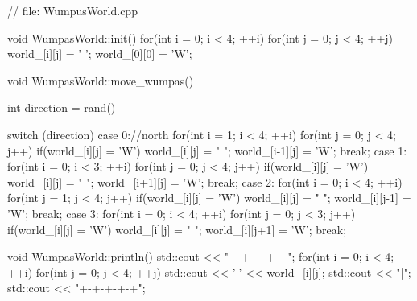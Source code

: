\begin{answercode}
// file: WumpusWorld.cpp

void WumpasWorld::init()
{
    for(int i = 0; i < 4; ++i)
    {
        for(int j = 0; j < 4; ++j)
        {
            world_[i][j] = ' ';
        }
    }
    world_[0][0] = 'W';
}

void WumpasWorld::move_wumpas()
{
        int direction = rand() %

        switch (direction)
        {
            case 0://north
                for(int i = 1; i < 4; ++i)
                {
                    for(int j = 0; j < 4; j++)
                    {
                        if(world_[i][j] = 'W')
                        {
                            world_[i][j] = " ";
                            world_[i-1][j] = 'W';
                        }
                    }
                }
                break;
            case 1:
                for(int i = 0; i < 3; ++i)
                {
                    for(int j = 0; j < 4; j++)
                    {
                        if(world_[i][j] = 'W')
                        {
                            world_[i][j] = " ";
                            world_[i+1][j] = 'W';
                        }
                    }
                }
                break;
            case 2:
                for(int i = 0; i < 4; ++i)
                {
                    for(int j = 1; j < 4; j++)
                    {
                        if(world_[i][j] = 'W')
                        {
                            world_[i][j] = " ";
                            world_[i][j-1] = 'W';
                        }
                    }
                }
                break;
            case 3:
                for(int i = 0; i < 4; ++i)
                {
                    for(int j = 0; j < 3; j++)
                    {
                        if(world_[i][j] = 'W')
                        {
                            world_[i][j] = " ";
                            world_[i][j+1] = 'W';
                        }
                    }
                }
                break;
        }
}

void WumpasWorld::println()
{
    std::cout << "+-+-+-+-+\n";
    for(int i = 0; i < 4; ++i)
    {
        for(int j = 0; j < 4; ++j)
        {
            std::cout << '|' << world_[i][j];
        }
        std::cout << "|\n";
        std::cout << "+-+-+-+-+\n";
    }
}

\end{answercode}


\newpage


